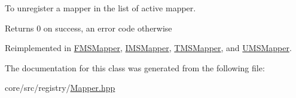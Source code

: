 To unregister a mapper in the list of active mapper. 

\begin{DoxyReturn}{Returns}
0 on success, an error code otherwise 
\end{DoxyReturn}


Reimplemented in \hyperlink{classFMSMapper_a6d775c27ca0443e6969c857eb2b87377}{FMSMapper}, \hyperlink{classIMSMapper_a688bf20409385a8c7505164153d243ac}{IMSMapper}, \hyperlink{classTMSMapper_a0780bd57fb6ddcbf4b2b9002370d307f}{TMSMapper}, and \hyperlink{classUMSMapper_ae825ecd7039b09d7ddd74be5e2236628}{UMSMapper}.



The documentation for this class was generated from the following file:\begin{DoxyCompactItemize}
\item 
core/src/registry/\hyperlink{Mapper_8hpp}{Mapper.hpp}\end{DoxyCompactItemize}
